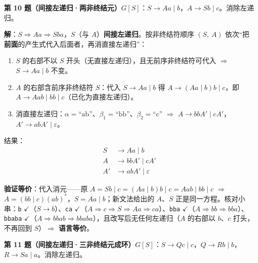 \documentclass[12pt,a4paper,fontset=windows]{ctexart}
\newcommand{\ok}{\ensuremath{\checkmark}}
\newcommand{\imp}{\ensuremath{\Rightarrow}}
\begin{document}
\begin{qbox}
{\large\bfseries 第 10 题（间接左递归·两非终结元）}\quad $G[S]$：$S \to Aa \mid b$，$A \to Sb \mid c$。消除左递归。
\end{qbox}

\textbf{解}：$S \Rightarrow Aa \Rightarrow Sba$，$S$（与 $A$）\textbf{间接左递归}。按非终结符顺序 $(S,\ A)$ 依次``把\textbf{前面}的产生式代入后面者，再消直接左递归''：
\begin{enumerate}
\item $S$ 的右部不以 $S$ 开头（无直接左递归），且无前序非终结符可代入 \imp{} $S \to Aa \mid b$ 不变。
\item $A$ 的右部含前序非终结符 $S$：代入 $S \to Aa \mid b$ 得 $A \to (Aa \mid b)b \mid c$，即 \textbf{$A \to Aab \mid bb \mid c$}（已化为直接左递归）。
\item 消直接左递归：$\alpha=\text{“ab”}$、$\beta_1=\text{“bb”}$、$\beta_2=\text{“c”}$ \imp{} $A \to bbA' \mid cA'$，$A' \to abA' \mid \varepsilon$。
\end{enumerate}
结果：
\[
\begin{aligned}
S  &\to A a \mid b\\
A  &\to b b A' \mid c A'\\
A' &\to a b A' \mid \varepsilon
\end{aligned}
\]

\textbf{验证等价}：代入消元——原 $A = Sb \mid c = (Aa \mid b)b \mid c = Aab \mid bb \mid c$ \imp{} $A=(bb \mid c)(ab)^*$，$S=Aa \mid b$；新文法给出的 $A$、$S$ 正是同一方程。核对小串：\texttt{b} \ok（$S \to b$）、\texttt{ca} \ok（$A \Rightarrow c \Rightarrow S \Rightarrow Aa \Rightarrow ca$）、\texttt{bba} \ok（$A \Rightarrow bb \Rightarrow bba$）、\texttt{bbaba} \ok（$A \Rightarrow bbab \Rightarrow bbaba$），且改写后无任何左递归（$A$ 的右部以 $b$、$c$ 打头，不再回到 $S$）\imp{} \textbf{语言等价}。

\begin{qbox}
{\large\bfseries 第 11 题（间接左递归·三非终结元成环）}\quad $G[S]$：$S \to Qc \mid c$，$Q \to Rb \mid b$，$R \to Sa \mid a$。消除左递归。
\end{qbox}
\end{document}

